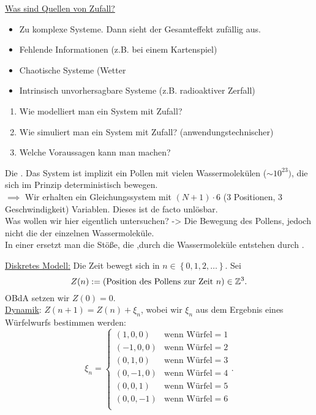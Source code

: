 \underline{Was sind Quellen von Zufall?}
\begin{itemize}
    \item Zu komplexe Systeme. Dann sieht der Gesamteffekt zufällig aus.
    \item Fehlende Informationen (z.B. bei einem Kartenspiel)
    \item Chaotische Systeme (Wetter
    \item Intrinsisch unvorhersagbare Systeme (z.B. radioaktiver Zerfall)
\end{itemize}
\begin{question}
    \begin{enumerate}[(1)]
        \item Wie modelliert man ein System mit Zufall?
        \item Wie simuliert man ein System mit Zufall? (anwendungstechnischer)
        \item Welche Voraussagen kann man machen?
    \end{enumerate}
\end{question}


\begin{example}
    Die . Das System ist implizit ein Pollen mit vielen Wassermolekülen ($\sim 10^{23})$, die sich im Prinzip deterministisch bewegen. \\
    $\implies$ Wir erhalten ein Gleichungssystem mit $(N+1)\cdot 6$ (3 Positionen, 3 Geschwindigkeit) Variablen. Dieses ist de facto unlösbar. \\

    Was wollen wir hier eigentlich untersuchen? -> Die Bewegung des Pollens, jedoch nicht die der einzelnen Wassermoleküle. \\
    In einer  ersetzt man die Stöße, die ,durch die Wassermoleküle entstehen durch . 
\end{example}

\underline{Diskretes Modell:} Die Zeit bewegt sich in $n\in \left \{0,1,2,\ldots\right\} $. Sei
\[
    Z(n) := (\text{Position des Pollens zur Zeit $n$}) \in  \mathbb{Z}^3
.\] 
OBdA setzen wir $Z(0) = 0$. \\
\underline{Dynamik}: $Z(n+1) = Z(n) + \xi_n$, wobei wir $\xi_n$ aus dem Ergebnis eines Würfelwurfs bestimmen werden:
 \[
\xi_n = \begin{cases}
    (1,0,0) & \text{wenn Würfel}=1 \\
    (-1,0,0) & \text{wenn Würfel}=2 \\
    (0,1,0) & \text{wenn Würfel}=3 \\
    (0,-1,0) & \text{wenn Würfel}=4 \\
    (0,0,1) & \text{wenn Würfel}=5 \\
    (0,0,-1) & \text{wenn Würfel}=6 \\

\end{cases}
.\] 

